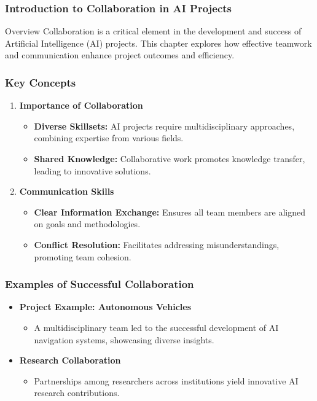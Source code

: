 \documentclass[aspectratio=169]{beamer}
\begin{document}
\frame{\titlepage}

\begin{frame}[fragile]
    \frametitle{Introduction to Collaboration in AI Projects}
    \begin{block}{Overview}
        Collaboration is a critical element in the development and success of Artificial Intelligence (AI) projects. 
        This chapter explores how effective teamwork and communication enhance project outcomes and efficiency.
    \end{block}
\end{frame}

\begin{frame}[fragile]
    \frametitle{Key Concepts}
    \begin{enumerate}
        \item \textbf{Importance of Collaboration}
        \begin{itemize}
            \item \textbf{Diverse Skillsets:} AI projects require multidisciplinary approaches, combining expertise from various fields.
            \item \textbf{Shared Knowledge:} Collaborative work promotes knowledge transfer, leading to innovative solutions.
        \end{itemize}
        
        \item \textbf{Communication Skills}
        \begin{itemize}
            \item \textbf{Clear Information Exchange:} Ensures all team members are aligned on goals and methodologies.
            \item \textbf{Conflict Resolution:} Facilitates addressing misunderstandings, promoting team cohesion.
        \end{itemize}
    \end{enumerate}
\end{frame}

\begin{frame}[fragile]
    \frametitle{Examples of Successful Collaboration}
    \begin{itemize}
        \item \textbf{Project Example: Autonomous Vehicles}
        \begin{itemize}
            \item A multidisciplinary team led to the successful development of AI navigation systems, showcasing diverse insights.
        \end{itemize}
        
        \item \textbf{Research Collaboration}
        \begin{itemize}
            \item Partnerships among researchers across institutions yield innovative AI research contributions.
        \end{itemize}
    \end{itemize}
\end{frame}
\end{document}
